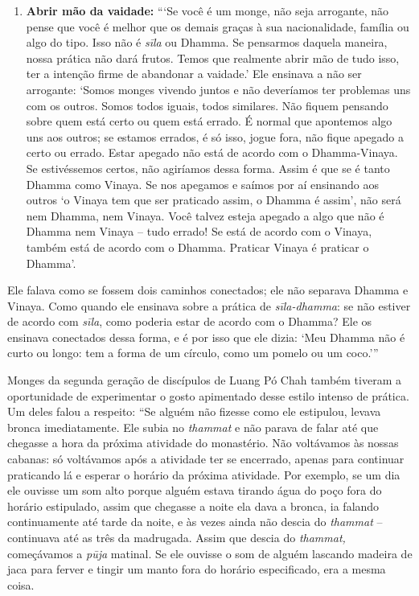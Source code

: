 \begin{enumerate}
\item
  \textbf{Abrir mão da vaidade:} ```Se você é um monge, não seja
  arrogante, não pense que você é melhor que os demais graças à sua
  nacionalidade, família ou algo do tipo. Isso não é \emph{sīla} ou
  Dhamma. Se pensarmos daquela maneira, nossa prática não dará frutos.
  Temos que realmente abrir mão de tudo isso, ter a intenção firme de
  abandonar a vaidade.' Ele ensinava a não ser arrogante: `Somos monges
  vivendo juntos e não deveríamos ter problemas uns com os outros. Somos
  todos iguais, todos similares. Não fiquem pensando sobre quem está
  certo ou quem está errado. É normal que apontemos algo uns aos outros;
  se estamos errados, é só isso, jogue fora, não fique apegado a certo
  ou errado. Estar apegado não está de acordo com o Dhamma-Vinaya. Se
  estivéssemos certos, não agiríamos dessa forma. Assim é que se é tanto
  Dhamma como Vinaya. Se nos apegamos e saímos por aí ensinando aos
  outros `o Vinaya tem que ser praticado assim, o Dhamma é assim', não
  será nem Dhamma, nem Vinaya. Você talvez esteja apegado a algo que não
  é Dhamma nem Vinaya -- tudo errado! Se está de acordo com o Vinaya,
  também está de acordo com o Dhamma. Praticar Vinaya é praticar o
  Dhamma'.
\end{enumerate}

Ele falava como se fossem dois caminhos conectados; ele não separava
Dhamma e Vinaya. Como quando ele ensinava sobre a prática de
\emph{sīla-dhamma}: se não estiver de acordo com \emph{sīla}, como
poderia estar de acordo com o Dhamma? Ele os ensinava conectados dessa
forma, e é por isso que ele dizia: `Meu Dhamma não é curto ou longo: tem
a forma de um círculo, como um pomelo ou um coco.'''

Monges da segunda geração de discípulos de Luang Pó Chah também tiveram
a oportunidade de experimentar o gosto apimentado desse estilo intenso
de prática. Um deles falou a respeito: ``Se alguém não fizesse como ele
estipulou, levava bronca imediatamente. Ele subia no \emph{thammat} e
não parava de falar até que chegasse a hora da próxima atividade do
monastério. Não voltávamos às nossas cabanas: só voltávamos após a
atividade ter se encerrado, apenas para continuar praticando lá e
esperar o horário da próxima atividade. Por exemplo, se um dia ele
ouvisse um som alto porque alguém estava tirando água do poço fora do
horário estipulado, assim que chegasse a noite ela dava a bronca, ia
falando continuamente até tarde da noite, e às vezes ainda não descia do
\emph{thammat} -- continuava até as três da madrugada. Assim que descia
do \emph{thammat,} começávamos a \emph{pūja} matinal. Se ele ouvisse o
som de alguém lascando madeira de jaca para ferver e tingir um manto
fora do horário especificado, era a mesma coisa.

